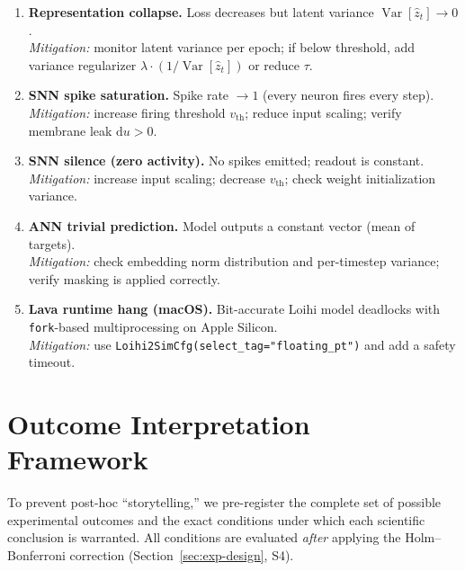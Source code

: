 \documentclass[11pt,a4paper]{article}
\begin{document}
\begin{enumerate}[label=\textbf{F\arabic*.},nosep]
\item \textbf{Representation collapse.}
  Loss decreases but latent variance $\operatorname{Var}[\hat{z}_t]
  \to 0$.\\
  \emph{Mitigation:} monitor latent variance per epoch; if below
  threshold, add variance regularizer
  $\lambda\!\cdot\!(1/\operatorname{Var}[\hat{z}_t])$ or reduce
  $\tau$.

\item \textbf{SNN spike saturation.}
  Spike rate $\to 1$ (every neuron fires every step).\\
  \emph{Mitigation:} increase firing threshold $v_{\text{th}}$;
  reduce input scaling; verify membrane leak $\mathrm{d}u > 0$.

\item \textbf{SNN silence (zero activity).}
  No spikes emitted; readout is constant.\\
  \emph{Mitigation:} increase input scaling; decrease
  $v_{\text{th}}$; check weight initialization variance.

\item \textbf{ANN trivial prediction.}
  Model outputs a constant vector (mean of targets).\\
  \emph{Mitigation:} check embedding norm distribution and
  per-timestep variance; verify masking is applied correctly.

\item \textbf{Lava runtime hang (macOS).}
  Bit-accurate Loihi model deadlocks with \texttt{fork}-based
  multiprocessing on Apple Silicon.\\
  \emph{Mitigation:} use
  \texttt{Loihi2SimCfg(select\_tag="floating\_pt")} and add a
  safety timeout.
\end{enumerate}

\section{Outcome Interpretation Framework}\label{sec:outcomes}

To prevent post-hoc ``storytelling,'' we pre-register the complete set of
possible experimental outcomes and the exact conditions under which each
scientific conclusion is warranted.  All conditions are evaluated
\emph{after} applying the Holm--Bonferroni correction
(Section~\ref{sec:exp-design}, S4).
\end{document}
